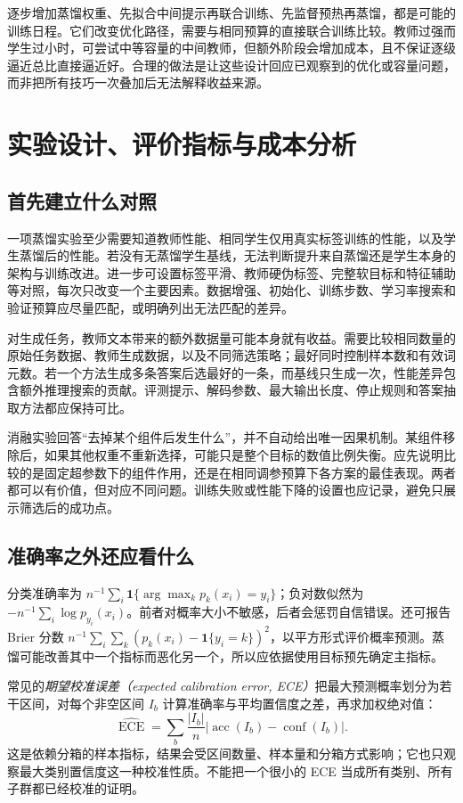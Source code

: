 \documentclass[UTF8,12pt,a4paper,fontset=fandol]{ctexart}
\begin{document}
逐步增加蒸馏权重、先拟合中间提示再联合训练、先监督预热再蒸馏，都是可能的训练日程。它们改变优化路径，需要与相同预算的直接联合训练比较。教师过强而学生过小时，可尝试中等容量的中间教师，但额外阶段会增加成本，且不保证逐级逼近总比直接逼近好。合理的做法是让这些设计回应已观察到的优化或容量问题，而非把所有技巧一次叠加后无法解释收益来源。

\section{实验设计、评价指标与成本分析}
\label{sec:kd-evaluation}

\subsection{首先建立什么对照}
一项蒸馏实验至少需要知道教师性能、相同学生仅用真实标签训练的性能，以及学生蒸馏后的性能。若没有无蒸馏学生基线，无法判断提升来自蒸馏还是学生本身的架构与训练改进。进一步可设置标签平滑、教师硬伪标签、完整软目标和特征辅助等对照，每次只改变一个主要因素。数据增强、初始化、训练步数、学习率搜索和验证预算应尽量匹配，或明确列出无法匹配的差异。

对生成任务，教师文本带来的额外数据量可能本身就有收益。需要比较相同数量的原始任务数据、教师生成数据，以及不同筛选策略；最好同时控制样本数和有效词元数。若一个方法生成多条答案后选最好的一条，而基线只生成一次，性能差异包含额外推理搜索的贡献。评测提示、解码参数、最大输出长度、停止规则和答案抽取方法都应保持可比。

消融实验回答“去掉某个组件后发生什么”，并不自动给出唯一因果机制。某组件移除后，如果其他权重不重新选择，可能只是整个目标的数值比例失衡。应先说明比较的是固定超参数下的组件作用，还是在相同调参预算下各方案的最佳表现。两者都可以有价值，但对应不同问题。训练失败或性能下降的设置也应记录，避免只展示筛选后的成功点。

\subsection{准确率之外还应看什么}
分类准确率为 $n^{-1}\sum_i\mathbf1\{\arg\max_kp_k(x_i)=y_i\}$；负对数似然为 $-n^{-1}\sum_i\log p_{y_i}(x_i)$。前者对概率大小不敏感，后者会惩罚自信错误。还可报告 Brier 分数 $n^{-1}\sum_i\sum_k(p_k(x_i)-\mathbf1\{y_i=k\})^2$，以平方形式评价概率预测。蒸馏可能改善其中一个指标而恶化另一个，所以应依据使用目标预先确定主指标。

常见的\emph{期望校准误差（expected calibration error, ECE）}把最大预测概率划分为若干区间，对每个非空区间 $I_b$ 计算准确率与平均置信度之差，再求加权绝对值：
\[
 \widehat{\operatorname{ECE}}=\sum_b\frac{|I_b|}{n}
 \left|\operatorname{acc}(I_b)-\operatorname{conf}(I_b)\right|.
\]
这是依赖分箱的样本指标，结果会受区间数量、样本量和分箱方式影响；它也只观察最大类别置信度这一种校准性质。不能把一个很小的 ECE 当成所有类别、所有子群都已经校准的证明。
\end{document}
